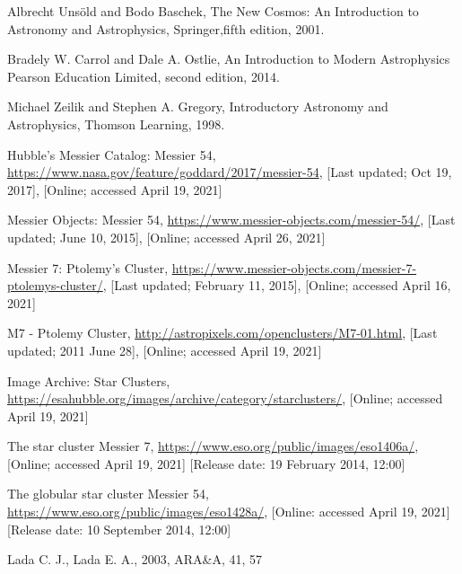 \documentclass[12pt]{article}
\begin{document}
	\pagebreak
	\begin{thebibliography}{}
		
		{Albrecht Uns\"{o}ld and Bodo Baschek},
		{The New Cosmos: An Introduction to Astronomy and Astrophysics},
		{Springer},{fifth edition}, 2001.
		
		{Bradely W. Carrol and Dale A. Ostlie},
		{An Introduction to Modern Astrophysics}
		{Pearson Education Limited},
		{second edition}, 2014.
		
		{Michael Zeilik and Stephen A. Gregory},
		{Introductory Astronomy and Astrophysics},
		{Thomson Learning}, 1998.
		
		{Hubble's Messier Catalog: Messier 54},
		{\url{https://www.nasa.gov/feature/goddard/2017/messier-54}},
		{[Last updated; Oct 19, 2017]},
		{[Online; accessed April 19, 2021]}
		
		{Messier Objects: Messier 54},
		{\url{https://www.messier-objects.com/messier-54/}},
		{[Last updated; June 10, 2015]},
		{[Online; accessed April 26, 2021]}
		
		{Messier 7: Ptolemy's Cluster},
		{\url{https://www.messier-objects.com/messier-7-ptolemys-cluster/}},
		{[Last updated; February 11, 2015]},
		{[Online; accessed April 16, 2021]}
		
		{M7 - Ptolemy Cluster},
		{\url{http://astropixels.com/openclusters/M7-01.html}},
		{[Last updated; 2011 June 28]},
		{[Online; accessed April 19, 2021]}
		
		{Image Archive: Star Clusters},
		{\url{https://esahubble.org/images/archive/category/starclusters/}},
		{[Online; accessed April 19, 2021]}
		
		{The star cluster Messier 7},
		{\url{https://www.eso.org/public/images/eso1406a/}},
		{[Online; accessed April 19, 2021]}
		{[Release date: 19 February 2014, 12:00]}
		
		{The globular star cluster Messier 54},
		{\url{https://www.eso.org/public/images/eso1428a/}},
		{[Online: accessed April 19, 2021]}
		{[Release date: 10 September 2014, 12:00]}
		
		{Lada C. J., Lada E. A.},
		{2003},
		{ARA\&A, 41, 57}
		
	\end{thebibliography}
\end{document}
